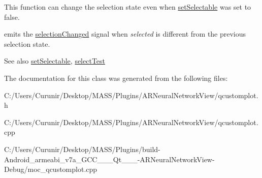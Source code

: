 This function can change the selection state even when \hyperlink{class_q_c_p_abstract_item_a8a8e32a55bc478b849756a78c2d87fd2}{set\+Selectable} was set to false.

emits the \hyperlink{class_q_c_p_abstract_item_aa5cffb034fc65dbb91c77e02c1c14251}{selection\+Changed} signal when {\itshape selected} is different from the previous selection state.

\begin{DoxySeeAlso}{See also}
\hyperlink{class_q_c_p_abstract_item_a8a8e32a55bc478b849756a78c2d87fd2}{set\+Selectable}, \hyperlink{class_q_c_p_abstract_item_ae41d0349d68bb802c49104afd100ba2a}{select\+Test} 
\end{DoxySeeAlso}


The documentation for this class was generated from the following files\+:\begin{DoxyCompactItemize}
\item 
C\+:/\+Users/\+Curunir/\+Desktop/\+M\+A\+S\+S/\+Plugins/\+A\+R\+Neural\+Network\+View/qcustomplot.\+h\item 
C\+:/\+Users/\+Curunir/\+Desktop/\+M\+A\+S\+S/\+Plugins/\+A\+R\+Neural\+Network\+View/qcustomplot.\+cpp\item 
C\+:/\+Users/\+Curunir/\+Desktop/\+M\+A\+S\+S/\+Plugins/build-\/\+Android\+\_\+armeabi\+\_\+v7a\+\_\+\+G\+C\+C\+\_\+\_\+\_\+\+Qt\+\_\+\_\+\_-\/\+A\+R\+Neural\+Network\+View-\/\+Debug/moc\+\_\+qcustomplot.\+cpp\end{DoxyCompactItemize}
